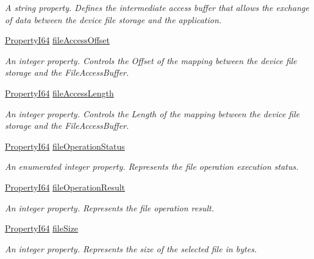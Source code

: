 \begin{DoxyCompactItemize}
\begin{DoxyCompactList}\small\item\em A string property. Defines the intermediate access buffer that allows the exchange of data between the device file storage and the application. \end{DoxyCompactList}\item 
\hyperlink{group___common_interface_ga81749b2696755513663492664a18a893}{Property\+I64} \hyperlink{classmv_i_m_p_a_c_t_1_1acquire_1_1_gen_i_cam_1_1_file_access_control_a92feefbf9e3688fd5e62e01922c8f365}{file\+Access\+Offset}
\begin{DoxyCompactList}\small\item\em An integer property. Controls the Offset of the mapping between the device file storage and the File\+Access\+Buffer. \end{DoxyCompactList}\item 
\hyperlink{group___common_interface_ga81749b2696755513663492664a18a893}{Property\+I64} \hyperlink{classmv_i_m_p_a_c_t_1_1acquire_1_1_gen_i_cam_1_1_file_access_control_a8c99b56aab262605e285f3e2b5a3ecb7}{file\+Access\+Length}
\begin{DoxyCompactList}\small\item\em An integer property. Controls the Length of the mapping between the device file storage and the File\+Access\+Buffer. \end{DoxyCompactList}\item 
\hyperlink{group___common_interface_ga81749b2696755513663492664a18a893}{Property\+I64} \hyperlink{classmv_i_m_p_a_c_t_1_1acquire_1_1_gen_i_cam_1_1_file_access_control_a8d7a328ad57ab278a4eb0cd3d7e0856f}{file\+Operation\+Status}
\begin{DoxyCompactList}\small\item\em An enumerated integer property. Represents the file operation execution status. \end{DoxyCompactList}\item 
\hyperlink{group___common_interface_ga81749b2696755513663492664a18a893}{Property\+I64} \hyperlink{classmv_i_m_p_a_c_t_1_1acquire_1_1_gen_i_cam_1_1_file_access_control_a97f3bb5c03a3f0b0ec3cece78e6548ae}{file\+Operation\+Result}
\begin{DoxyCompactList}\small\item\em An integer property. Represents the file operation result. \end{DoxyCompactList}\item 
\hyperlink{group___common_interface_ga81749b2696755513663492664a18a893}{Property\+I64} \hyperlink{classmv_i_m_p_a_c_t_1_1acquire_1_1_gen_i_cam_1_1_file_access_control_aa1ce3e612b1e7a27711d8590471cf3bc}{file\+Size}
\begin{DoxyCompactList}\small\item\em An integer property. Represents the size of the selected file in bytes. \end{DoxyCompactList}\end{DoxyCompactItemize}


